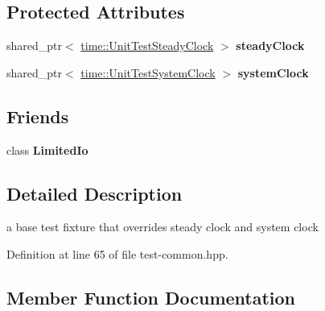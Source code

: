 \subsection*{Protected Attributes}
\begin{DoxyCompactItemize}
\item 
shared\+\_\+ptr$<$ \hyperlink{classndn_1_1time_1_1UnitTestClock}{time\+::\+Unit\+Test\+Steady\+Clock} $>$ {\bfseries steady\+Clock}\hypertarget{classnfd_1_1tests_1_1UnitTestTimeFixture_a7dd77b909be1a90faea14bd3d6593a5d}{}\label{classnfd_1_1tests_1_1UnitTestTimeFixture_a7dd77b909be1a90faea14bd3d6593a5d}

\item 
shared\+\_\+ptr$<$ \hyperlink{classndn_1_1time_1_1UnitTestClock}{time\+::\+Unit\+Test\+System\+Clock} $>$ {\bfseries system\+Clock}\hypertarget{classnfd_1_1tests_1_1UnitTestTimeFixture_a7bae4e329602ed9d7003b113b1d69458}{}\label{classnfd_1_1tests_1_1UnitTestTimeFixture_a7bae4e329602ed9d7003b113b1d69458}

\end{DoxyCompactItemize}
\subsection*{Friends}
\begin{DoxyCompactItemize}
\item 
class {\bfseries Limited\+Io}\hypertarget{classnfd_1_1tests_1_1UnitTestTimeFixture_ad6ac15f32c5781d8f98b5288973e0c9b}{}\label{classnfd_1_1tests_1_1UnitTestTimeFixture_ad6ac15f32c5781d8f98b5288973e0c9b}

\end{DoxyCompactItemize}


\subsection{Detailed Description}
a base test fixture that overrides steady clock and system clock 

Definition at line 65 of file test-\/common.\+hpp.



\subsection{Member Function Documentation}
